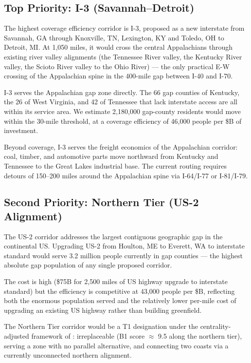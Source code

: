 \subsection{Top Priority: I-3 (Savannah–Detroit)}

The highest coverage efficiency corridor is I-3, proposed as a new interstate from Savannah, GA through Knoxville, TN, Lexington, KY and Toledo, OH to Detroit, MI. At 1,050 miles, it would cross the central Appalachians through existing river valley alignments (the Tennessee River valley, the Kentucky River valley, the Scioto River valley to the Ohio River) --- the only practical E-W crossing of the Appalachian spine in the 400-mile gap between I-40 and I-70.

I-3 serves the Appalachian gap zone directly. The 66 gap counties of Kentucky, the 26 of West Virginia, and 42 of Tennessee that lack interstate access are all within its service area. We estimate 2,180,000 gap-county residents would move within the 30-mile threshold, at a coverage efficiency of 46,000 people per \$B of investment.

Beyond coverage, I-3 serves the freight economics of the Appalachian corridor: coal, timber, and automotive parts move northward from Kentucky and Tennessee to the Great Lakes industrial base. The current routing requires detours of 150--200 miles around the Appalachian spine via I-64/I-77 or I-81/I-79.

\subsection{Second Priority: Northern Tier (US-2 Alignment)}

The US-2 corridor addresses the largest contiguous geographic gap in the continental US. Upgrading US-2 from Houlton, ME to Everett, WA to interstate standard would serve 3.2 million people currently in gap counties --- the highest absolute gap population of any single proposed corridor.

The cost is high (\$75B for 2,500 miles of US highway upgrade to interstate standard) but the efficiency is competitive at 43,000 people per \$B, reflecting both the enormous population served and the relatively lower per-mile cost of upgrading an existing US highway rather than building greenfield.

The Northern Tier corridor would be a T1 designation under the centrality-adjusted framework of \citet{ROUTE_A1}: irreplaceable (B1 score $\approx$ 9.5 along the northern tier), serving a zone with no parallel alternative, and connecting two coasts via a currently unconnected northern alignment.

